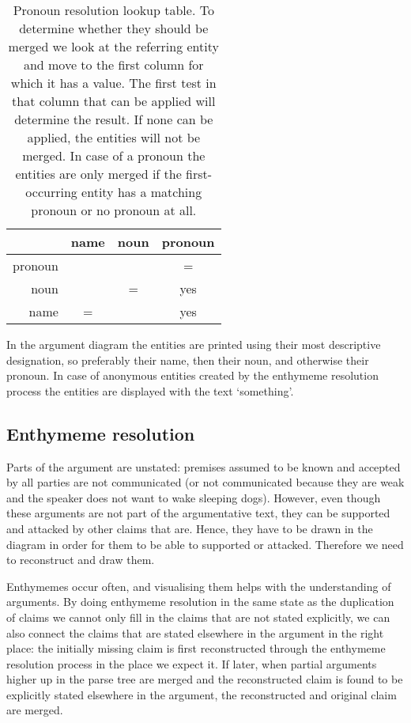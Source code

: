 \begin{table}
    \begin{tabular}{r|ccc|}
                & name  & noun  & pronoun \\
        \hline
        pronoun &       &       & =  \\
        noun    &       & =     & yes \\
        name    & =     &       & yes \\
        \hline
    \end{tabular}
    \caption{Pronoun resolution lookup table. To determine whether they should be merged we look at the referring entity and move to the first column for which it has a value. The first test in that column that can be applied will determine the result. If none can be applied, the entities will not be merged. In case of a pronoun the entities are only merged if the first-occurring entity has a matching pronoun or no pronoun at all.}
    \label{table:anaphoraresolution}
\end{table}

In the argument diagram the entities are printed using their most descriptive designation, so preferably their name, then their noun, and otherwise their pronoun. In case of anonymous entities created by the enthymeme resolution process the entities are displayed with the text `something'.

\subsection{Enthymeme resolution}
Parts of the argument are unstated: premises assumed to be known and accepted by all parties are not communicated (or not communicated because they are weak and the speaker does not want to wake sleeping dogs). However, even though these arguments are not part of the argumentative text, they can be supported and attacked by other claims that are. Hence, they have to be drawn in the diagram in order for them to be able to supported or attacked. Therefore we need to reconstruct and draw them.

Enthymemes occur often, and visualising them helps with the understanding of arguments. By doing enthymeme resolution in the same state as the duplication of claims we cannot only fill in the claims that are not stated explicitly, we can also connect the claims that are stated elsewhere in the argument in the right place: the initially missing claim is first reconstructed through the enthymeme resolution process in the place we expect it. If later, when partial arguments higher up in the parse tree are merged and the reconstructed claim is found to be explicitly stated elsewhere in the argument, the reconstructed and original claim are merged.

